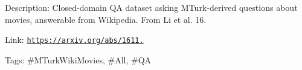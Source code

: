 Description\+: Closed-\/domain QA dataset asking M\+Turk-\/derived questions about movies, answerable from Wikipedia. From Li et al. \textquotesingle{}16.

Link\+: \href{https://arxiv.org/abs/1611.09823}{\tt https\+://arxiv.\+org/abs/1611.}

Tags\+: \#\+M\+Turk\+Wiki\+Movies, \#\+All, \#\+QA 